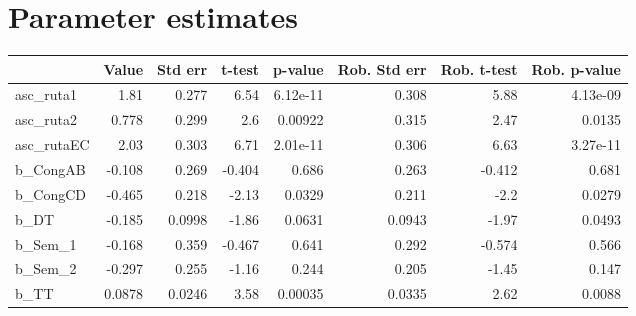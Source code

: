 \section{Parameter estimates}
\begin{tabular}{lrrrrrrr}
\toprule
{} &  Value &  Std err &  t-test &  p-value &  Rob. Std err &  Rob. t-test &  Rob. p-value \\
\midrule
asc\_ruta1  &   1.81 &    0.277 &    6.54 & 6.12e-11 &         0.308 &         5.88 &      4.13e-09 \\
asc\_ruta2  &  0.778 &    0.299 &     2.6 &  0.00922 &         0.315 &         2.47 &        0.0135 \\
asc\_rutaEC &   2.03 &    0.303 &    6.71 & 2.01e-11 &         0.306 &         6.63 &      3.27e-11 \\
b\_CongAB   & -0.108 &    0.269 &  -0.404 &    0.686 &         0.263 &       -0.412 &         0.681 \\
b\_CongCD   & -0.465 &    0.218 &   -2.13 &   0.0329 &         0.211 &         -2.2 &        0.0279 \\
b\_DT       & -0.185 &   0.0998 &   -1.86 &   0.0631 &        0.0943 &        -1.97 &        0.0493 \\
b\_Sem\_1    & -0.168 &    0.359 &  -0.467 &    0.641 &         0.292 &       -0.574 &         0.566 \\
b\_Sem\_2    & -0.297 &    0.255 &   -1.16 &    0.244 &         0.205 &        -1.45 &         0.147 \\
b\_TT       & 0.0878 &   0.0246 &    3.58 &  0.00035 &        0.0335 &         2.62 &        0.0088 \\
\bottomrule
\end{tabular}

